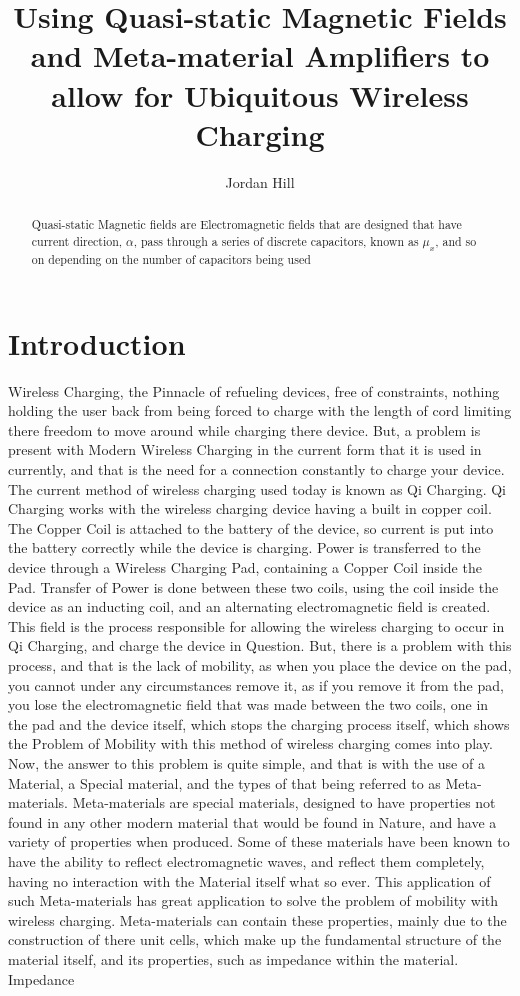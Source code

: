 \documentclass[]{article}
\title{Using Quasi-static Magnetic Fields and Meta-material Amplifiers to allow for Ubiquitous Wireless Charging}
\author{Jordan Hill}
\begin{document}
\maketitle

\begin{abstract}
Quasi-static Magnetic fields are Electromagnetic fields that are designed that have current direction, $\alpha$, pass through a series of discrete capacitors, known as $\mu_{x}$, and so on depending on the number of capacitors being used
\end{abstract}

\section{Introduction}
Wireless Charging, the Pinnacle of refueling devices, free of constraints, nothing holding the user back from being forced to charge with the length of cord limiting there freedom to move around while charging there device. But, a problem is present with Modern Wireless Charging in the current form that it is used in currently, and that is the need for a connection constantly to charge your device. The current method of wireless charging used today is known as Qi Charging. Qi Charging works with the wireless charging device having a built in copper coil. The Copper Coil is attached to the battery of the device, so current is put into the battery correctly while the device is charging. Power is transferred to the device through a Wireless Charging Pad, containing a Copper Coil inside the Pad. Transfer of Power is done between these two coils, using the coil inside the device as an inducting coil, and an alternating electromagnetic field is created. This field is the process responsible for allowing the wireless charging to occur in Qi Charging, and charge the device in Question. But, there is a problem with this process, and that is the lack of mobility, as when you place the device on the pad, you cannot under any circumstances remove it, as if you remove it from the pad, you lose the electromagnetic field that was made between the two coils, one in the pad and the device itself, which stops the charging process itself, which shows the Problem of Mobility with this method of wireless charging comes into play. Now, the answer to this problem is quite simple, and that is with the use of a Material, a Special material, and the types of that being referred to as Meta-materials. Meta-materials are special materials, designed to have properties not found in any other modern material that would be found in Nature, and have a variety of properties when produced. Some of these materials have been known to have the ability to reflect electromagnetic waves, and reflect them completely, having no interaction with the Material itself what so ever. This application of such Meta-materials has great application to solve the problem of mobility with wireless charging. Meta-materials can contain these properties, mainly due to the construction of there unit cells, which make up the fundamental structure of the material itself, and its properties, such as impedance within the material. Impedance  
\end{document}
